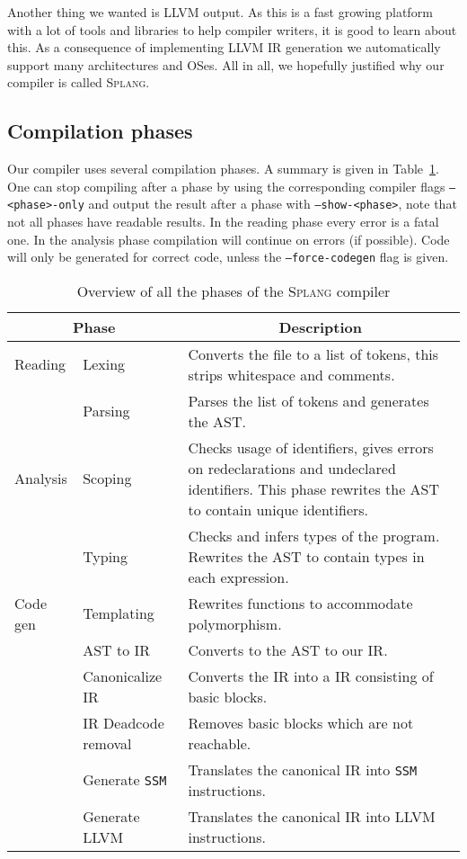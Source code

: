 \documentclass[11pt]{amsart}
\newcommand{\llvm}{\textsc{LLVM}\xspace}
\newcommand{\ssm}{\texttt{SSM}\xspace}
\newcommand{\splang}{\textsc{Splang}\xspace}
\newcommand{\flag}[1]{\texttt{#1}}
\begin{document}
Another thing we wanted is \llvm output. As this is a fast growing platform with a lot of tools and libraries to help compiler writers, it is good to learn about this. As a consequence of implementing \llvm IR generation we automatically support many architectures and OSes. All in all, we hopefully justified why our compiler is called \splang.

\subsection{Compilation phases}
Our compiler uses several compilation phases. A summary is given in Table~\ref{tab:overview}. One can stop compiling after a phase by using the corresponding compiler flags \flag{--<phase>-only} and output the result after a phase with \flag{--show-<phase>}, note that not all phases have readable results. In the reading phase every error is a fatal one. In the analysis phase compilation will continue on errors (if possible). Code will only be generated for correct code, unless the \flag{--force-codegen} flag is given.

\begin{table}
\begin{tabular}{l l p{8cm}}
\multicolumn{2}{c}{Phase} & \multicolumn{1}{c}{Description}\\
\hline Reading
 & Lexing & Converts the file to a list of tokens, this strips whitespace and comments. \\
 & Parsing & Parses the list of tokens and generates the AST. \\
\hline Analysis
 & Scoping & Checks usage of identifiers, gives errors on redeclarations and undeclared identifiers. This phase rewrites the AST to contain unique identifiers. \\
 & Typing & Checks and infers types of the program. Rewrites the AST to contain types in each expression. \\
\hline Code gen
 & Templating & Rewrites functions to accommodate polymorphism. \\
 & AST to IR & Converts to the AST to our IR. \\
 & Canonicalize IR & Converts the IR into a IR consisting of basic blocks. \\
 & IR Deadcode removal & Removes basic blocks which are not reachable. \\
 & Generate \ssm & Translates the canonical IR into \ssm instructions. \\
 & Generate \llvm & Translates the canonical IR into \llvm instructions.
\end{tabular}
\caption{Overview of all the phases of the \splang compiler}
\label{tab:overview}
\end{table}
\end{document}
